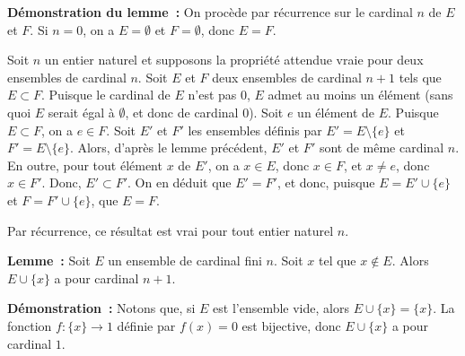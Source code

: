 \medskip

\noindent\textbf{Démonstration du lemme :} 
    On procède par récurrence sur le cardinal $n$ de $E$ et $F$. 
    Si $n = 0$, on a $E = \emptyset$ et $F = \emptyset$, donc $E = F$. 

    Soit $n$ un entier naturel et supposons la propriété attendue vraie pour deux ensembles de cardinal $n$. 
    Soit $E$ et $F$ deux ensembles de cardinal $n+1$ tels que $E \subset F$. 
    Puisque le cardinal de $E$ n'est pas $0$, $E$ admet au moins un élément (sans quoi $E$ serait égal à $\emptyset$, et donc de cardinal $0$). 
    Soit $e$ un élément de $E$. 
    Puisque $E \subset F$, on a $e \in F$. 
    Soit $E'$ et $F'$ les ensembles définis par $E' = E \setminus \lbrace e \rbrace$ et $F' = E \setminus \lbrace e \rbrace$. 
    Alors, d'après le lemme précédent, $E'$ et $F'$ sont de même cardinal $n$. 
    En outre, pour tout élément $x$ de $E'$, on a $x \in E$, donc $x \in F$, et $x \neq e$, donc $x \in F'$.
    Donc, $E' \subset F'$. 
    On en déduit que $E' = F'$, et donc, puisque $E = E' \cup \lbrace e \rbrace$ et $F = F' \cup \lbrace e \rbrace$, que $E = F$. 

    Par récurrence, ce résultat est vrai pour tout entier naturel $n$.

    \done 

\medskip

\noindent\textbf{Lemme :} Soit $E$ un ensemble de cardinal fini $n$. 
    Soit $x$ tel que $x \notin E$.
    Alors $E \cup \lbrace x \rbrace$ a pour cardinal $n+1$.

\medskip

\noindent\textbf{Démonstration :} 
    Notons que, si $E$ est l'ensemble vide, alors $E \cup \lbrace x \rbrace = \lbrace x \rbrace$. 
    La fonction $f: \lbrace x \rbrace \to 1$ définie par $f(x) = 0$ est bijective, donc $E \cup \lbrace x \rbrace$ a pour cardinal $1$.

